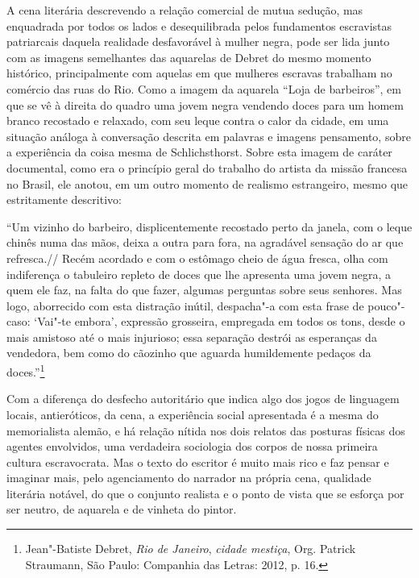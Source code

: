 A cena literária descrevendo a relação comercial de mutua sedução, mas
enquadrada por todos os lados e desequilibrada pelos fundamentos
escravistas patriarcais daquela realidade desfavorável à mulher negra,
pode ser lida junto com as imagens semelhantes das aquarelas de Debret
do mesmo momento histórico, principalmente com aquelas em que mulheres
escravas trabalham no comércio das ruas do Rio. Como a imagem da
aquarela ``Loja de barbeiros'', em que se vê à direita do quadro uma
jovem negra vendendo doces para um homem branco recostado e relaxado,
com seu leque contra o calor da cidade, em uma situação análoga à
conversação descrita em palavras e imagens pensamento, sobre a
experiência da coisa mesma de Schlichsthorst. Sobre esta imagem de
caráter documental, como era o princípio geral do trabalho do artista da
missão francesa no Brasil, ele anotou, em um outro momento de realismo
estrangeiro, mesmo que estritamente descritivo:

``Um vizinho do barbeiro, displicentemente recostado perto da janela,
com o leque chinês numa das mãos, deixa a outra para fora, na agradável
sensação do ar que refresca.// Recém acordado e com o estômago cheio de
água fresca, olha com indiferença o tabuleiro repleto de doces que lhe
apresenta uma jovem negra, a quem ele faz, na falta do que fazer,
algumas perguntas sobre seus senhores. Mas logo, aborrecido com esta
distração inútil, despacha"-a com esta frase de pouco"-caso: `Vai"-te
embora', expressão grosseira, empregada em todos os tons, desde o mais
amistoso até o mais injurioso; essa separação destrói as esperanças da
vendedora, bem como do cãozinho que aguarda humildemente pedaços da
doces.''\footnote{Jean"-Batiste Debret, \emph{Rio de Janeiro},
  \emph{cidade mestiça}, Org. Patrick Straumann, São Paulo: Companhia
  das Letras: 2012, p. 16.}

Com a diferença do desfecho autoritário que indica algo dos jogos de
linguagem locais, antieróticos, da cena, a experiência social
apresentada é a mesma do memorialista alemão, e há relação nítida nos
dois relatos das posturas físicas dos agentes envolvidos, uma verdadeira
sociologia dos corpos de nossa primeira cultura escravocrata. Mas o
texto do escritor é muito mais rico e faz pensar e imaginar mais, pelo
agenciamento do narrador na própria cena, qualidade literária notável,
do que o conjunto realista e o ponto de vista que se esforça por ser
neutro, de aquarela e de vinheta do pintor.

